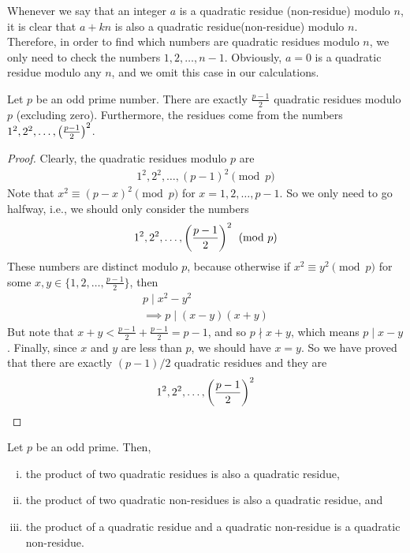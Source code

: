 \begin{note}
	Whenever we say that an integer $a$ is a quadratic residue (non-residue) modulo $n$, it is clear that $a+kn$ is also a quadratic residue(non-residue) modulo $n$. Therefore, in order to find which numbers are quadratic residues modulo $n$, we only need to check the numbers $1, 2, \ldots, n-1$. Obviously, $a=0$ is a quadratic residue modulo any $n$, and we omit this case in our calculations.
\end{note}

\begin{theorem}\label{thm:primeresidue}
	Let $p$ be an odd prime number. There are exactly $\displaystyle \frac{p-1}{2}$ quadratic residues modulo $p$ (excluding zero). Furthermore, the residues come from the numbers $1^2, 2^2, \ldots, \left(\frac{p-1}{2}\right)^2$.
\end{theorem}

\begin{proof}
	Clearly, the quadratic residues modulo $p$ are
	\begin{align*}
		1^2, 2^2, \ldots, (p-1)^2 \pmod p
	\end{align*}
	Note that $x^2 \equiv (p-x)^2 \pmod p$ for $x=1,2,\ldots,p-1$. So we only need to go halfway, i.e., we should only consider the numbers
	\begin{align*}
		1^2, 2^2, \ldots, \left(\frac{p-1}{2}\right)^2 \pmod p
	\end{align*}
	These numbers are distinct modulo $p$, because otherwise if $x^2 \equiv y^2 \pmod p$ for some $x,y \in \{1,2,\ldots,\frac{p-1}{2}\}$, then
	\begin{align*}
		p\mid x^2 -y^2\\
		\implies p\mid (x-y)(x+y)
	\end{align*}
	But note that $x+y< \frac{p-1}{2}+\frac{p-1}{2}=p-1$, and so $p \nmid x+y$, which means $p\mid x-y$. Finally, since $x$ and $y$ are less than $p$, we should have $x=y$.
	So we have proved that there are exactly $(p-1)/2$ quadratic residues and they are
	\begin{align*}
		1^2, 2^2, \ldots, \left(\frac{p-1}{2}\right)^2
	\end{align*}
\end{proof}

\begin{theorem}\label{thm:qrnr}
	Let $p$ be an odd prime. Then,
	\begin{enumerate}[(i)]
		\item the product of two quadratic residues is also a quadratic residue,
		\item the product of two quadratic non-residues is also a quadratic residue, and
		\item the product of a quadratic residue and a quadratic non-residue is a quadratic non-residue.
	\end{enumerate}
\end{theorem}

